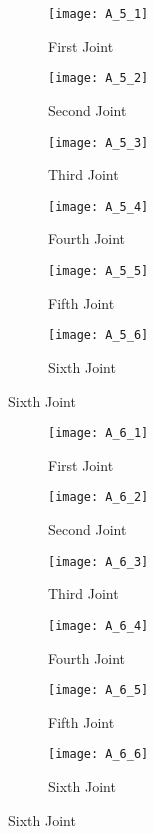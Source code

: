 \begin{figure}[H]
  \caption{External wrench during high torque experiment}
  \begin{subfigure}[t]{0.5\textwidth}
    \centering
    \texttt{[image: A\_5\_1]} 
    \caption{First Joint}
  \end{subfigure}
  \begin{subfigure}[t]{0.5\textwidth}
    \centering
    \texttt{[image: A\_5\_2]}
    \caption{Second Joint}
  \end{subfigure}
  \begin{subfigure}[t]{0.5\textwidth}
    \centering
    \texttt{[image: A\_5\_3]}
    \caption{Third Joint}
  \end{subfigure}
  \begin{subfigure}[t]{0.5\textwidth}
    \centering
    \texttt{[image: A\_5\_4]}
    \caption{Fourth Joint}
  \end{subfigure}
  \begin{subfigure}[t]{0.5\textwidth}
    \centering
    \texttt{[image: A\_5\_5]}
    \caption{Fifth Joint}
  \end{subfigure}
  \begin{subfigure}[t]{0.5\textwidth}
    \centering
    \texttt{[image: A\_5\_6]}
    \caption{Sixth Joint}
  \end{subfigure}
\end{figure}


\begin{figure}[H]
  \caption{Denso Gain Identification}
  \begin{subfigure}[t]{0.5\textwidth}
    \centering
    \texttt{[image: A\_6\_1]} 
    \caption{First Joint}
  \end{subfigure}
  \begin{subfigure}[t]{0.5\textwidth}
    \centering
    \texttt{[image: A\_6\_2]}
    \caption{Second Joint}
  \end{subfigure}
  \begin{subfigure}[t]{0.5\textwidth}
    \centering
    \texttt{[image: A\_6\_3]}
    \caption{Third Joint}
  \end{subfigure}
  \begin{subfigure}[t]{0.5\textwidth}
    \centering
    \texttt{[image: A\_6\_4]}
    \caption{Fourth Joint}
  \end{subfigure}
  \begin{subfigure}[t]{0.5\textwidth}
    \centering
    \texttt{[image: A\_6\_5]}
    \caption{Fifth Joint}
  \end{subfigure}
  \begin{subfigure}[t]{0.5\textwidth}
    \centering
    \texttt{[image: A\_6\_6]}
    \caption{Sixth Joint}
  \end{subfigure}
\end{figure}


